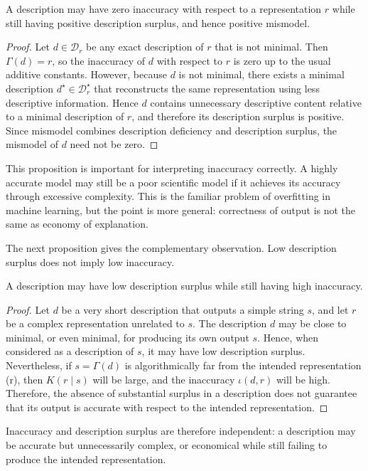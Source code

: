\begin{proposition}
A description may have zero inaccuracy with respect to a representation $r$ while still having positive description surplus, and hence positive mismodel.
\end{proposition}
\begin{proof}
Let $d\in\mathcal D_r$ be any exact description of $r$ that is not minimal. Then $\Gamma(d)=r$, so the inaccuracy of $d$ with respect to $r$ is zero up to the usual additive constants. However, because $d$ is not minimal, there exists a minimal description $d^\star \in \mathcal D_r^\star$ that reconstructs the same representation using less descriptive information. Hence $d$ contains unnecessary descriptive content relative to a minimal description of $r$, and therefore its description surplus is positive. Since mismodel combines description deficiency and description surplus, the mismodel of $d$ need not be zero.
\end{proof}

This proposition is important for interpreting inaccuracy correctly. A highly accurate model may still be a poor scientific model if it achieves its accuracy through excessive complexity. This is the familiar problem of overfitting in machine learning, but the point is more general: correctness of output is not the same as economy of explanation.

The next proposition gives the complementary observation. Low description surplus does not imply low inaccuracy.

\begin{proposition}
A description may have low description surplus while still having high inaccuracy.
\end{proposition}
\begin{proof}
Let $d$ be a very short description that outputs a simple string $s$, and let $r$ be a complex representation unrelated to $s$. The description $d$ may be close to minimal, or even minimal, for producing its own output $s$. Hence, when considered as a description of $s$, it may have low description surplus. Nevertheless, if $s=\Gamma(d)$ is algorithmically far from the intended representation (r), then $K(r\mid s)$ will be large, and the inaccuracy $\iota(d,r)$ will be high. Therefore, the absence of substantial surplus in a description does not guarantee that its output is accurate with respect to the intended representation.
\end{proof}

Inaccuracy and description surplus are therefore independent: a description may be accurate but unnecessarily complex, or economical while still failing to produce the intended representation.

